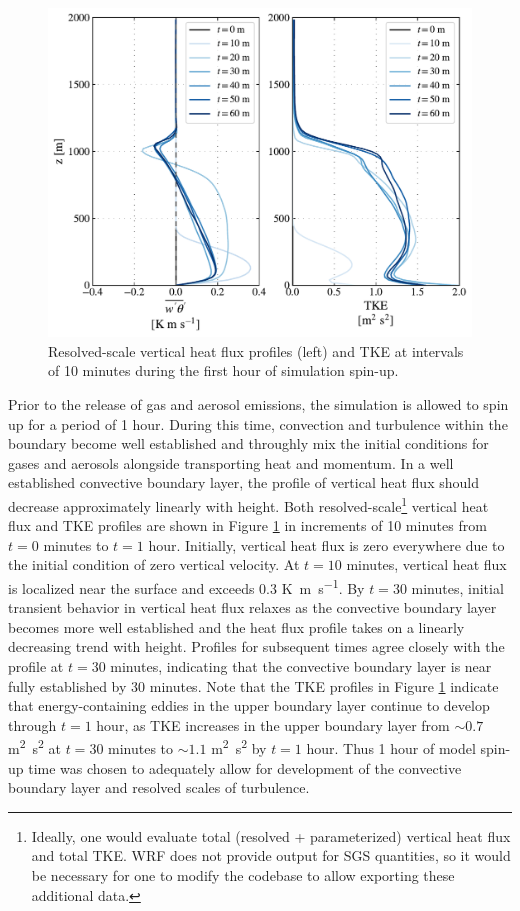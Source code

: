 \begin{figure}[h]
	\centering
	\includegraphics[width=\textwidth]{figures/chapter3/heat-flux-and-tke-profile.pdf}
	\caption{Resolved-scale vertical heat flux profiles (left) and TKE at intervals of 10 minutes during the first hour of simulation spin-up.}
	\label{fig:heat-flux}
\end{figure}

Prior to the release of gas and aerosol emissions, the simulation is allowed to spin up for a period of 1 hour. During this time, convection and turbulence within the boundary become well established and throughly mix the initial conditions for gases and aerosols alongside transporting heat and momentum. In a well established convective boundary layer, the profile of vertical heat flux should decrease approximately linearly with height. Both resolved-scale\footnote{Ideally, one would evaluate total (resolved + parameterized) vertical heat flux and total TKE. WRF does not provide output for SGS quantities, so it would be necessary for one to modify the codebase to allow exporting these additional data.} vertical heat flux and TKE profiles are shown in Figure \ref{fig:heat-flux} in increments of 10 minutes from $t=0$ minutes to $t=1$ hour. Initially, vertical heat flux is zero everywhere due to the initial condition of zero vertical velocity. At $t=10$ minutes, vertical heat flux is localized near the surface and exceeds 0.3 \si{K.m.s^{-1}}. By $t=30$ minutes, initial transient behavior in vertical heat flux relaxes as the convective boundary layer becomes more well established and the heat flux profile takes on a linearly decreasing trend with height. Profiles for subsequent times agree closely with the profile at $t=30$ minutes, indicating that the convective boundary layer is near fully established by 30 minutes. Note that the TKE profiles in Figure  \ref{fig:heat-flux} indicate that energy-containing eddies in the upper boundary layer continue to develop through $t=1$ hour, as TKE increases in the upper boundary layer from $\sim 0.7$ \si{m^2.s^2} at $t=30$ minutes to $\sim 1.1$ \si{m^2.s^2} by $t=1$ hour. Thus 1 hour of model spin-up time was chosen to adequately allow for development of the convective boundary layer and resolved scales of turbulence.



